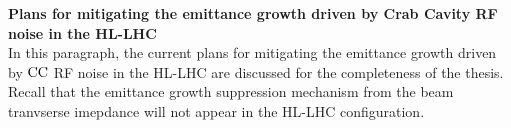 



\textbf{Plans for mitigating the emittance growth driven by Crab Cavity RF noise in the HL-LHC}\\
In this paragraph, the current plans for mitigating the emittance growth driven by ${\mathrm{CC}}$ RF noise in the HL-LHC are discussed for the completeness of the thesis. Recall that the emittance growth suppression mechanism from the beam tranvserse imepdance will not appear in the HL-LHC configuration.




